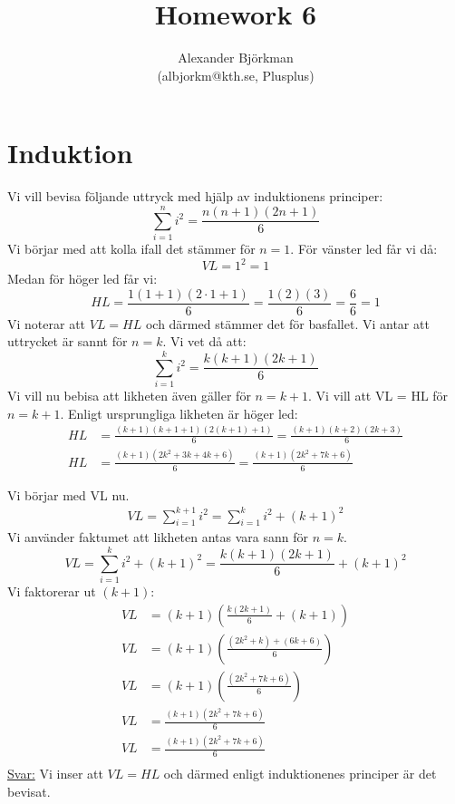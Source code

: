 \title{Homework 6}
\author{Alexander Björkman \\ \small (albjorkm@kth.se, Plusplus) }
\date{}

\pagestyle{fancy}
\fancyhead{}
\maketitle

\section{Induktion}
Vi vill bevisa följande uttryck med hjälp av induktionens principer:
\[
    \sum_{i=1}^{n} i^2 = \frac{n(n+1)(2n+1)}{6}
\]
Vi börjar med att kolla ifall det stämmer för $n=1$.
För vänster led får vi då:
\[
    VL = 1^2 = 1
\]
Medan för höger led får vi:
\[
    HL = \frac{1(1+1)(2\cdot1+1)}{6} = \frac{1(2)(3)}{6} = \frac{6}{6} = 1
\]
Vi noterar att $VL = HL$ och därmed stämmer det för basfallet.
Vi antar att uttrycket är sannt för $n=k$.
Vi vet då att:
\[
    \sum_{i=1}^{k} i^2 = \frac{k(k+1)(2k+1)}{6}
\]
Vi vill nu bebisa att likheten även gäller för $n=k+1$.
Vi vill att VL = HL för $n=k+1$. Enligt ursprungliga likheten är höger led:
\begin{align*}
    HL &= \frac{(k+1)(k+1+1)(2(k+1)+1)}{6} = \frac{(k+1)(k+2)(2k+3)}{6} \\
    HL &= \frac{(k+1)(2k^2+3k+4k+6)}{6} = \frac{(k+1)(2k^2+7k+6)}{6}
\end{align*}

Vi börjar med VL nu.
\begin{align*}
    VL = \sum_{i=1}^{k+1} i^2 = \sum_{i=1}^{k} i^2 + (k+1)^2
\end{align*}
Vi använder faktumet att likheten antas vara sann för $n=k$.
\[
    VL = \sum_{i=1}^{k} i^2 + (k+1)^2 = \frac{k(k+1)(2k+1)}{6} + (k+1)^2
\]
Vi faktorerar ut $(k+1)$:
\begin{align*}
    VL &= (k+1)(\frac{k(2k+1)}{6} + (k+1)) \\
    VL &= (k+1)(\frac{(2k^2+k) + (6k+6)}{6}) \\
    VL &= (k+1)(\frac{(2k^2+7k+6)}{6}) \\
    VL &= \frac{(k+1)(2k^2+7k+6)}{6} \\
    VL &= \frac{(k+1)(2k^2+7k+6)}{6} \\
\end{align*}
\underline{Svar:} Vi inser att $VL=HL$ och därmed enligt induktionenes principer är det bevisat.
\newpage

